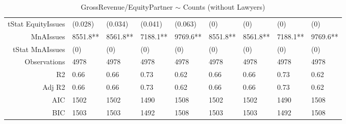\begin{table}[ht]
\begin{tabular}{rllllllll}
  tStat EquityIssues & (0.028) & (0.034) & (0.041) & (0.063) & (0) & (0) & (0) & (0) \\ 
  MnAIssues & 8551.8** & 8561.8** & 7188.1** & 9769.6** & 8551.8** & 8561.8** & 7188.1** & 9769.6** \\ 
  tStat MnAIssues & (0) & (0) & (0) & (0) & (0) & (0) & (0) & (0) \\ 
  Observations & 4978 & 4978 & 4978 & 4978 & 4978 & 4978 & 4978 & 4978 \\ 
  R2 & 0.66 & 0.66 & 0.73 & 0.62 & 0.66 & 0.66 & 0.73 & 0.62 \\ 
  Adj R2 & 0.66 & 0.66 & 0.73 & 0.62 & 0.66 & 0.66 & 0.73 & 0.62 \\ 
  AIC & 1502 & 1502 & 1490 & 1508 & 1502 & 1502 & 1490 & 1508 \\ 
  BIC & 1503 & 1503 & 1492 & 1508 & 1503 & 1503 & 1492 & 1508 \\ 
   \hline
\end{tabular}
\caption{GrossRevenue/EquityPartner $\sim$ Counts (without Lawyers)} 
\end{table}
